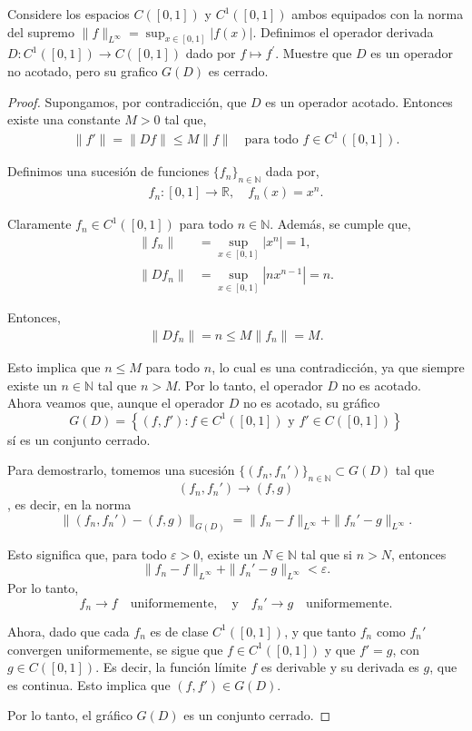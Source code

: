  Considere los espacios $C([0,1])$ y $C^1([0,1])$ ambos equipados con la norma del supremo $\|f\|_{L^\infty}=\displaystyle\sup_{x\in[0,1]}|f(x)|.$ Definimos el operador derivada $D:C^1([0,1])\to C([0,1])$ dado por $f\mapsto f^\prime.$ Muestre que $D$ es un operador no acotado, pero su grafico $G(D)$ es cerrado.

\begin{proof}
\hfill

Supongamos, por contradicción, que $D$ es un operador acotado. Entonces existe una constante $M > 0$ tal que,
\begin{align*}
    \|f'\| = \|Df\| \leq M\|f\| \quad \text{para todo } f \in C^{1}([0,1]).
\end{align*}

Definimos una sucesión de funciones $\{f_n\}_{n \in \mathbb{N}}$ dada por,
\begin{align*}
    f_n : [0,1] \to \mathbb{R}, \quad f_n(x) = x^n.
\end{align*}

Claramente $f_n \in C^1([0,1])$ para todo $n \in \mathbb{N}$. Además, se cumple que,
\begin{align*}
    \|f_n\| &= \sup_{x \in [0,1]} |x^n| = 1,\\
    \|Df_n\| &= \sup_{x \in [0,1]} |n x^{n-1}| = n.
\end{align*}

Entonces,
\begin{align*}
    \|Df_n\| = n \leq M \|f_n\| = M.
\end{align*}

Esto implica que $n \leq M$ para todo $n$, lo cual es una contradicción, ya que siempre existe un $n \in \mathbb{N}$ tal que $n > M$. Por lo tanto, el operador $D$ no es acotado.\\

Ahora veamos que, aunque el operador \( D \) no es acotado, su gráfico  
\[
G(D) = \left\{ (f, f') : f \in C^1([0,1]) \text{ y } f' \in C([0,1]) \right\}
\]  
sí es un conjunto cerrado.

Para demostrarlo, tomemos una sucesión \(\{(f_n, f_n')\}_{n \in \mathbb{N}} \subset G(D)\) tal que  
\[
(f_n, f_n') \to (f, g)
\]  
, es decir, en la norma  
\[
\|(f_n, f_n') - (f, g)\|_{G(D)} = \|f_n - f\|_{L^\infty} + \|f_n' - g\|_{L^\infty}.
\]

Esto significa que, para todo \(\varepsilon > 0\), existe un \(N \in \mathbb{N}\) tal que si \(n > N\), entonces  
\[
\|f_n - f\|_{L^\infty} + \|f_n' - g\|_{L^\infty} < \varepsilon.
\]  
Por lo tanto,  
\[
f_n \to f \quad \text{uniformemente}, \quad \text{y} \quad f_n' \to g \quad \text{uniformemente}.
\]

Ahora, dado que cada \(f_n\) es de clase \(C^1([0,1])\), y que tanto \(f_n\) como \(f_n'\) convergen uniformemente, se sigue que \(f \in C^1([0,1])\) y que \( f' = g \), con \( g \in C([0,1]) \). Es decir, la función límite \( f \) es derivable y su derivada es \( g \), que es continua. Esto implica que \((f, f') \in G(D)\).  

Por lo tanto, el gráfico \(G(D)\) es un conjunto cerrado.


\end{proof}
